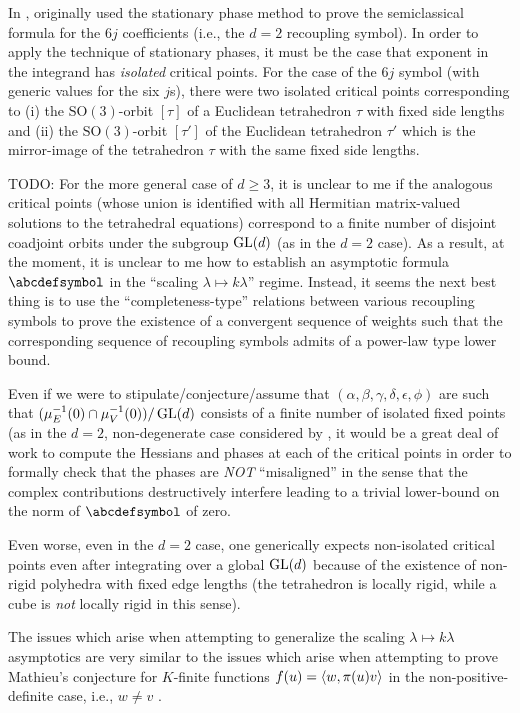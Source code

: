 \documentclass[notitlepage, 10pt]{article}
\begin{document}
\begin{rem}
    In \cite{roberts1999classical}, \citeauthor{roberts1999classical} originally used the stationary phase  method to prove the \citeauthor{ponzano1968semiclassical} semiclassical formula \cite{ponzano1968semiclassical} for the $6j$ coefficients (i.e., the $d=2$ recoupling symbol).
    In order to apply the technique of stationary phases, it must be the case that exponent in the integrand has \textit{isolated} critical points.
    For the case of the $6j$ symbol (with generic values for the six $j$s), there were two isolated critical points corresponding to (i) the $\mathrm{SO}(3)$-orbit $[\tau]$ of a Euclidean tetrahedron $\tau$ with fixed side lengths and (ii) the $\mathrm{SO}(3)$-orbit $[\tau']$ of the Euclidean tetrahedron $\tau'$ which is the mirror-image of the tetrahedron $\tau$ with the same fixed side lengths.
    
    {\color{red}
        TODO: For the more general case of $d \geq 3$, it is unclear to me if the analogous critical points (whose union is identified with all Hermitian matrix-valued solutions to the tetrahedral equations) correspond to a finite number of disjoint coadjoint orbits under the subgroup $\operatorname{GL}(d)$ (as in the $d=2$ case). 
        As a result, at the moment, it is unclear to me how to establish an asymptotic formula $\abcdefsymbol$ in the ``scaling $\lambda \mapsto k \lambda$'' regime.
        Instead, it seems the next best thing is to use the ``completeness-type'' relations between various recoupling symbols to prove the existence of a convergent sequence of weights such that the corresponding sequence of recoupling symbols admits of a power-law type lower bound.
    
        Even if we were to stipulate/conjecture/assume that $(\alpha,\beta,\gamma,\delta,\epsilon,\phi)$ are such that $(\mu_{E}^{-1}(0) \cap \mu_{V}^{-1}(0))/\operatorname{GL}(d)$ consists of a finite number of isolated fixed points (as in the $d = 2$, non-degenerate case considered by \citeauthor{roberts1999classical}, it would be a great deal of work to compute the Hessians and phases at each of the critical points in order to formally check that the phases are \textit{NOT} ``misaligned'' in the sense that the complex contributions destructively interfere leading to a trivial lower-bound on the norm of $\abcdefsymbol$ of zero.

        Even worse, even in the $d=2$ case, one generically expects non-isolated critical points even after integrating over a global $\operatorname{GL}(d)$ because of the existence of non-rigid polyhedra with fixed edge lengths (the tetrahedron is locally rigid, while a cube is \textit{not} locally rigid in this sense).
        
        The issues which arise when attempting to generalize the scaling $\lambda \mapsto k \lambda$ asymptotics are very similar to the issues which arise when attempting to prove Mathieu's conjecture for $K$-finite functions $f(u) = \braket{w, \pi(u)v}$ in the non-positive-definite case, i.e., $w \neq v$ \cite{franks2020minimal}.
    }
\end{rem}
\end{document}
